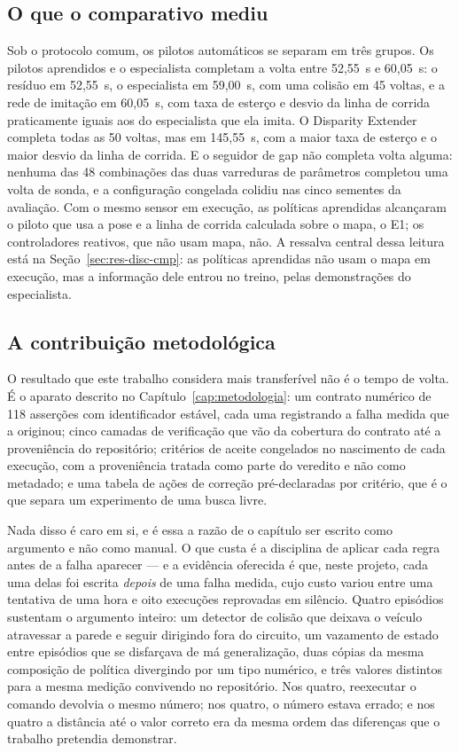 \subsection*{O que o comparativo mediu}

Sob o protocolo comum, os pilotos automáticos se separam em três grupos. Os
pilotos aprendidos e o especialista completam a volta entre 52,55~s e 60,05~s: o
resíduo em 52,55~s, o especialista em 59,00~s, com uma colisão em 45 voltas, e a
rede de imitação em 60,05~s, com taxa de esterço e desvio da linha de corrida
praticamente iguais aos do especialista que ela imita. O Disparity Extender
completa todas as 50 voltas, mas em 145,55~s, com a maior taxa de esterço e o
maior desvio da linha de corrida. E o seguidor de gap não completa volta alguma:
nenhuma das 48 combinações das duas varreduras de parâmetros completou uma volta
de sonda, e a configuração congelada colidiu nas cinco sementes da avaliação. Com
o mesmo sensor em execução, as políticas aprendidas alcançaram o piloto que usa
a pose e a linha de corrida calculada sobre o mapa, o E1; os controladores
reativos, que não usam mapa, não. A ressalva central dessa leitura está na
Seção~\ref{sec:res-disc-cmp}: as políticas aprendidas não usam o mapa em
execução, mas a informação dele entrou no treino, pelas demonstrações do
especialista.

\subsection*{A contribuição metodológica}

O resultado que este trabalho considera mais transferível não é o tempo de volta.
É o aparato descrito no Capítulo~\ref{cap:metodologia}: um contrato numérico de
118 asserções com identificador estável, cada uma registrando a falha medida que a
originou; cinco camadas de verificação que vão da cobertura do contrato até a
proveniência do repositório; critérios de
aceite congelados no nascimento de cada execução, com a proveniência tratada como
parte do veredito e não como metadado; e uma tabela de ações de correção
pré-declaradas por critério, que é o que separa um experimento de uma busca
livre.

Nada disso é caro em si, e é essa a razão de o capítulo ser escrito como
argumento e não como manual. O que custa é a disciplina de aplicar cada regra
antes de a falha aparecer --- e a evidência oferecida é que, neste projeto, cada
uma delas foi escrita \textit{depois} de uma falha medida, cujo custo variou
entre uma tentativa de uma hora e oito execuções reprovadas em silêncio. Quatro
episódios sustentam o argumento inteiro: um detector de colisão que deixava o
veículo atravessar a parede e seguir dirigindo fora do circuito, um vazamento de
estado entre episódios que se disfarçava de má generalização, duas cópias da mesma
composição de política divergindo por um tipo numérico, e três valores distintos
para a mesma medição convivendo no repositório. Nos quatro, reexecutar o comando
devolvia o mesmo número; nos quatro, o número estava errado; e nos quatro a
distância até o valor correto era da mesma ordem das diferenças que o trabalho
pretendia demonstrar.


